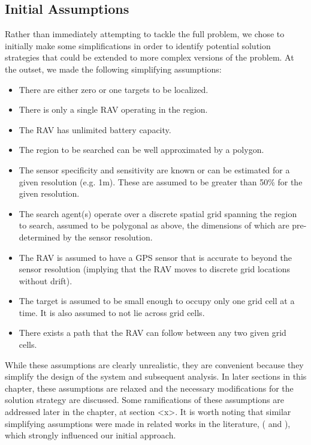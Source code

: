 \subsection{Initial Assumptions}\label{subsec:initalAssumptions}

Rather than immediately attempting to tackle the full problem, we chose to initially make some simplifications in order to identify potential solution strategies that could be extended to more complex versions of the problem. At the outset, we made the following simplifying assumptions:
\begin{itemize}
    \item There are either zero or one targets to be localized.
    \item There is only a single RAV operating in the region.
    \item The RAV has unlimited battery capacity.
    \item The region to be searched can be well approximated by a polygon.
    \item The sensor specificity and sensitivity are known or can be estimated for a given resolution (e.g. 1m). These are assumed to be greater than 50\% for the given resolution.
    \item The search agent(s) operate over a discrete spatial grid spanning the region to search, assumed to be polygonal as above, the dimensions of which are pre-determined by the sensor resolution.
    \item The RAV is assumed to have a GPS sensor that is accurate to beyond the sensor resolution (implying that the RAV moves to discrete grid locations without drift).
    \item The target is assumed to be small enough to occupy only one grid cell at a time. It is also assumed to not lie across grid cells.
    \item There exists a path that the RAV can follow between any two given grid cells.
\end{itemize}
While these assumptions are clearly unrealistic, they are convenient because they simplify the design of the system and subsequent analysis. In later sections in this chapter, these assumptions are relaxed and the necessary modifications for the solution strategy are discussed. Some ramifications of these assumptions are addressed later in the chapter, at section <x>. It is worth noting that similar simplifying assumptions were made in related works in the literature, 
(\cite{Chung2007ASearch} and \cite{Waharte2010SupportingRAVs}), %
which strongly influenced our initial approach.